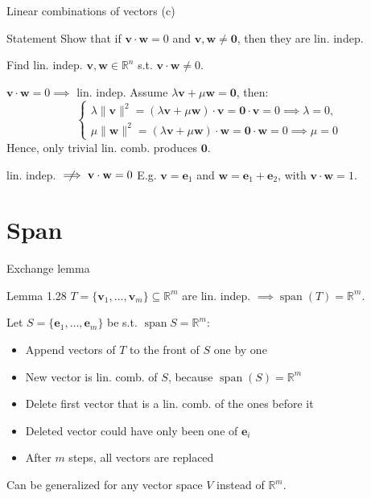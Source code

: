 \documentclass[10pt]{beamer}
\begin{document}
\begin{frame}{Linear combinations of vectors (c)}
    \begin{block}{Statement}
        Show that if $\mathbf v \cdot \mathbf w=0$ and $\mathbf v, \mathbf w \neq \mathbf 0$, then they are lin. indep.

        Find lin. indep. $\mathbf v, \mathbf w \in \mathbb R^n$ s.t. $\mathbf v \cdot \mathbf w \neq 0$.
    \end{block}
    
    \begin{block}{$\mathbf v \cdot \mathbf w = 0 \implies$ lin. indep.}
        Assume $\lambda \mathbf v + \mu \mathbf w = \mathbf 0$, then:
        $$
        \begin{cases}
            \lambda \|\mathbf v\|^2 = (\lambda \mathbf v + \mu \mathbf w) \cdot \mathbf v = \mathbf 0 \cdot \mathbf v = 0 \implies \lambda = 0, \\
            \mu \|\mathbf w\|^2 = (\lambda \mathbf v + \mu \mathbf w) \cdot \mathbf w = \mathbf 0 \cdot \mathbf w = 0 \implies \mu = 0
        \end{cases}
        $$
        Hence, only trivial lin. comb. produces $\mathbf 0$.
    \end{block}
    \begin{block}{lin. indep. $\centernot\implies \mathbf v \cdot \mathbf w = 0$}
        E.g. $\mathbf v = \mathbf e_1$ and $\mathbf w = \mathbf e_1 + \mathbf e_2$, with $\mathbf v \cdot \mathbf w = 1$.
    \end{block}
\end{frame}

\section{Span}
\begin{frame}{Exchange lemma}
    \begin{block}{Lemma 1.28}
        $T = \{\mathbf v_1, \dots, \mathbf v_m\} \subseteq \mathbb R^m$ are lin. indep. $\implies \operatorname{span}(T) = \mathbb R^m$.
    \end{block}
    Let $S = \{\mathbf e_1, \dots, \mathbf e_m\}$ be s.t. $\operatorname{span} S = \mathbb R^m$:

    \begin{itemize}
        \item Append vectors of $T$ to the front of $S$ one by one
        \item New vector is lin. comb. of $S$, because $\operatorname{span}(S) = \mathbb R^m$
        \item Delete first vector that is a lin. comb. of the ones before it
        \item Deleted vector could have only been one of $\mathbf e_i$
        \item After $m$ steps, all vectors are replaced
    \end{itemize}

    Can be generalized for any vector space $V$ instead of $\mathbb R^m$.
\end{frame}
\end{document}
